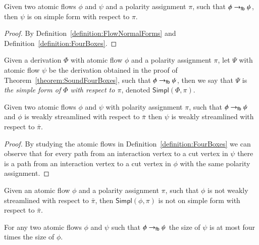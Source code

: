 \begin{lemma}\label{lemma:FourBoxesSimpleForm}
Given two atomic flows $\phi$ and $\psi$ and a polarity assignment $\pi$, such that $\phi\to_{\mathsf{fb}}\psi$, then $\psi$ is on simple form with respect to $\pi$.
\end{lemma}

\begin{proof}
By Definition~\vref{definition:FlowNormalForms} and Definition~\vref{definition:FourBoxes}.
\end{proof}

\newcommand{\Simpl}{\mathsf{Simpl}}
\begin{definition}\label{definition:DerSimpleForm}
Given a derivation $\Phi$ with atomic flow $\phi$ and a polarity assignment $\pi$, let $\Psi$ with atomic flow $\psi$ be the derivation obtained in the proof of Theorem~\ref{theorem:SoundFourBoxes}, such that $\phi\to_{\mathsf{fb}}\psi$, then we say that $\Psi$ is \emph{the simple form of $\Phi$ with respect to $\pi$}, denoted $\Simpl(\Phi,\pi)$.
\end{definition}

\begin{lemma}\label{lemma:FourBoxesStreamlining}
Given two atomic flows $\phi$ and $\psi$ with polarity assignment $\pi$, such that $\phi\to_{\mathsf{fb}}\psi$ and $\phi$ is weakly streamlined with respect to $\bar\pi$ then $\psi$ is weakly streamlined with respect to $\bar\pi$.
\end{lemma}

\begin{proof}
By studying the atomic flows in Definition~\vref{definition:FourBoxes} we can observe that for every path from an interaction vertex to a cut vertex in $\psi$ there is a path from an interaction vertex to a cut vertex in $\phi$ with the same polarity assignment.
\end{proof}


\begin{remark}\label{remark:FourBoxesDestroySimpleForm}
Given an atomic flow $\phi$ and a polarity assignment $\pi$, such that $\phi$ is not weakly streamlined with respect to $\bar\pi$, then $\Simpl(\phi,\pi)$ is not on simple form with respect to $\bar\pi$.
\end{remark}


\begin{lemma}\label{lemma:FourBoxesSize}
For any two atomic flows $\phi$ and $\psi$ such that $\phi\to_{\mathsf{fb}}\psi$ the size of $\psi$ is at most four times the size of $\phi$.
\end{lemma}
